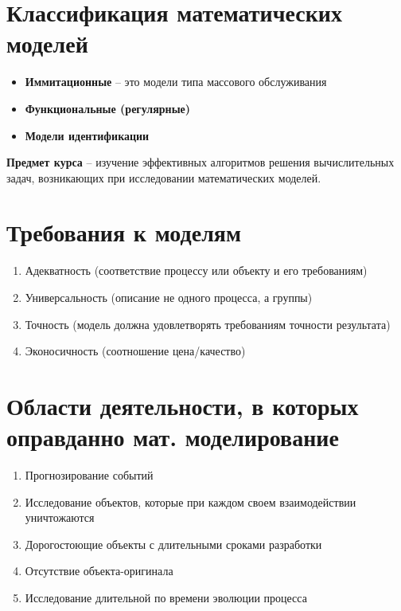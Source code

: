 \section{Классификация математических моделей}

\begin{itemize}
    \item \textbf{Иммитационные} --
        это модели типа массового обслуживания
    \item \textbf{Функциональные (регулярные)}
    \item \textbf{Модели идентификации}
\end{itemize}

\textbf{Предмет курса} -- изучение эффективных алгоритмов решения
вычислительных задач, возникающих при исследовании математических
моделей.

\section{Требования к моделям}

\begin{enumerate}
    \item Адекватность
        (соответствие процессу или объекту и его требованиям)
    \item Универсальность
        (описание не одного процесса, а группы)
    \item Точность
        (модель должна удовлетворять требованиям точности результата)
    \item Эконосичность
        (соотношение цена/качество)
\end{enumerate}

\section{Области деятельности, в которых оправданно мат. моделирование}

\begin{enumerate}
    \item Прогнозирование событий
    \item Исследование объектов, которые при каждом своем
        взаимодействии уничтожаются
    \item Дорогостоющие объекты с длительными сроками разработки
    \item Отсутствие объекта-оригинала
    \item Исследование длительной по времени эволюции процесса
\end{enumerate}

